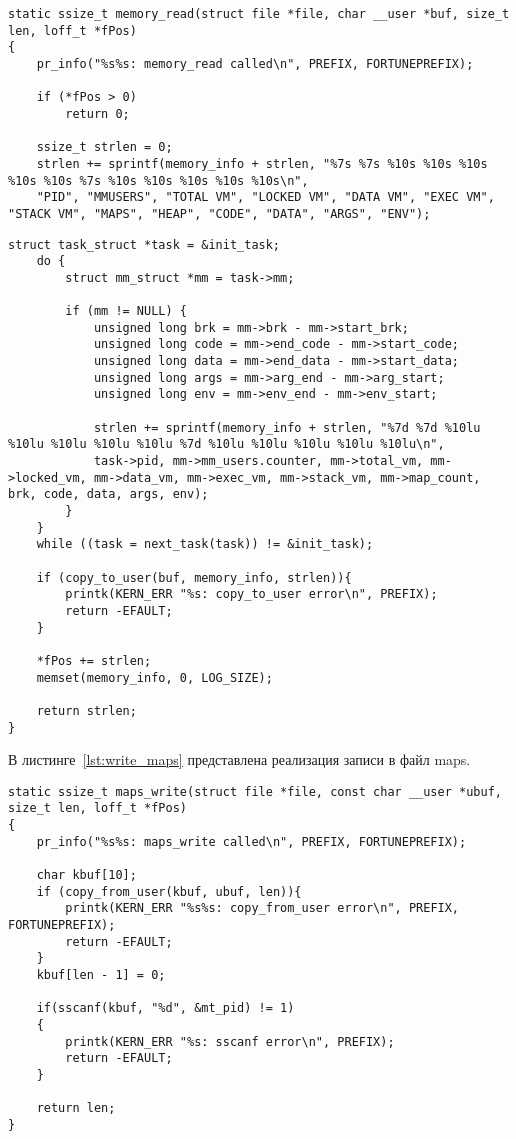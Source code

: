 \begin{lstlisting}[label=lst:read_memory, caption=Реализация функции чтения из файла memory]			
static ssize_t memory_read(struct file *file, char __user *buf, size_t len, loff_t *fPos)
{
	pr_info("%s%s: memory_read called\n", PREFIX, FORTUNEPREFIX);
	
	if (*fPos > 0)
		return 0;
	
	ssize_t strlen = 0;
	strlen += sprintf(memory_info + strlen, "%7s %7s %10s %10s %10s %10s %10s %7s %10s %10s %10s %10s %10s\n", 
	"PID", "MMUSERS", "TOTAL VM", "LOCKED VM", "DATA VM", "EXEC VM", "STACK VM", "MAPS", "HEAP", "CODE", "DATA", "ARGS", "ENV");
\end{lstlisting}	
\begin{lstlisting}[label=lst:read_memory-2, caption=Реализация функции чтения из файла memory]	
	struct task_struct *task = &init_task;
	do {
		struct mm_struct *mm = task->mm;
		
		if (mm != NULL) {
			unsigned long brk = mm->brk - mm->start_brk; 
			unsigned long code = mm->end_code - mm->start_code;   
			unsigned long data = mm->end_data - mm->start_data;
			unsigned long args = mm->arg_end - mm->arg_start;
			unsigned long env = mm->env_end - mm->env_start;
			
			strlen += sprintf(memory_info + strlen, "%7d %7d %10lu %10lu %10lu %10lu %10lu %7d %10lu %10lu %10lu %10lu %10lu\n", 
			task->pid, mm->mm_users.counter, mm->total_vm, mm->locked_vm, mm->data_vm, mm->exec_vm, mm->stack_vm, mm->map_count, brk, code, data, args, env);
		}
	}
	while ((task = next_task(task)) != &init_task);
	
	if (copy_to_user(buf, memory_info, strlen)){
		printk(KERN_ERR "%s: copy_to_user error\n", PREFIX);
		return -EFAULT;
	}
	
	*fPos += strlen;
	memset(memory_info, 0, LOG_SIZE);
	
	return strlen;
}
\end{lstlisting}

В листинге~\ref{lst:write_maps} представлена реализация записи в файл maps.

\begin{lstlisting}[label=lst:write_maps, caption=Реализация функции записи в файл maps]			
static ssize_t maps_write(struct file *file, const char __user *ubuf, size_t len, loff_t *fPos)
{
	pr_info("%s%s: maps_write called\n", PREFIX, FORTUNEPREFIX);
	
	char kbuf[10];
	if (copy_from_user(kbuf, ubuf, len)){
		printk(KERN_ERR "%s%s: copy_from_user error\n", PREFIX, FORTUNEPREFIX);
		return -EFAULT;
	}
	kbuf[len - 1] = 0;
	
	if(sscanf(kbuf, "%d", &mt_pid) != 1)
	{
		printk(KERN_ERR "%s: sscanf error\n", PREFIX);
		return -EFAULT;
	}
	
	return len;
}
\end{lstlisting}

